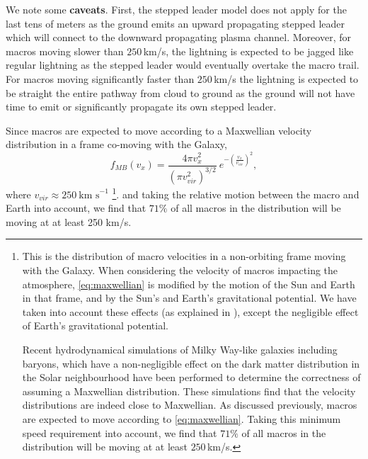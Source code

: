 \documentclass[%
 reprint,
 amsmath,amssymb,
 aps,
]{revtex4-2}
\begin{document}
        We note some \textbf{caveats}. First, the stepped leader model does not apply for the last tens of meters as the ground emits an upward propagating stepped leader which will connect to the downward propagating plasma channel. Moreover, for macros moving slower than $250\,$km/s, the lightning is expected to be jagged like regular lightning as the stepped leader would eventually overtake the macro trail. For macros moving significantly faster than $250\,$km/s the lightning is expected to be straight the entire pathway from cloud to ground as the ground will not have time to emit or significantly propagate its own stepped leader. 

        Since macros are expected to move according to a Maxwellian velocity distribution in a frame co-moving with the Galaxy,
        \begin{equation}\label{eq:maxwellian}
        	f_{MB}(v_x) = 
        		\frac{4\pi v_x^2}
        		{\left({\pi v_{vir}^2}\right)^{3/2}}~
        		e^{-\left(\frac{v_x}{v_{vir}}\right)^2}, 
        \end{equation}
        where $v_{vir} \approx 250~ \text{km s}^{-1}$ \footnote{
        	This is the distribution of macro velocities in a non-orbiting frame moving with the Galaxy. When considering the velocity of macros impacting the atmosphere, \eqref{eq:maxwellian} is modified by the motion of the Sun and Earth in that frame, and by the Sun's and Earth's gravitational potential. We have taken into account these effects (as explained in \cite{Freese2013}), except the negligible effect of Earth's gravitational potential.

        	Recent hydrodynamical simulations of Milky Way-like galaxies including baryons, which have a non-negligible effect on the dark matter distribution in the Solar neighbourhood \cite{Tanabashi2018} have been performed to determine the correctness of assuming a Maxwellian distribution. These simulations find that the velocity distributions are indeed close to Maxwellian. As discussed previously, macros are expected to move according to \eqref{eq:maxwellian}. Taking this minimum speed requirement into account, we find that $71\%$ of all macros in the distribution will be moving at at least $250\,$km/s. 
    	}.
        and taking the relative motion between the macro and Earth into account, we find that $71\%$ of all macros in the distribution will be moving at at least 250 km/s.
\end{document}
